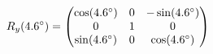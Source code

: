 \documentclass[preview]{standalone}
\begin{document}
\begin{align*}
\special{dvisvgm:raw <g id='unique000'>}R_y(4.6^\circ) = \begin{pmatrix} \cos(4.6^\circ) & 0 & -\sin(4.6^\circ) \\ 0 & 1 & 0 \\ \sin(4.6^\circ) & 0 & \cos(4.6^\circ) \end{pmatrix}\special{dvisvgm:raw </g>}
\end{align*}
\end{document}
